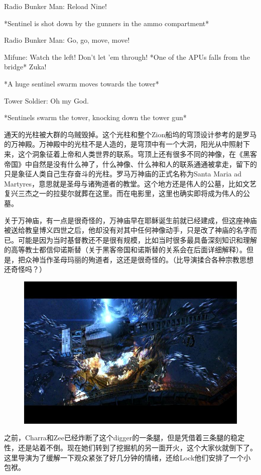 \documentclass[UTF8]{ctexart}
\newenvironment{myquote}{\color{green} \setlength{\leftskip}{6em} \setlength{\rightskip}{4em} \setlength{\parindent}{-2em}}{\par}
\begin{document}
\begin{myquote}
Radio Bunker Man: Reload Nine!

*Sentinel is shot down by the gunners in the ammo compartment*

Radio Bunker Man: Go, go, move, move!

Mifune: Watch the left! Don't let 'em through! *One of the APUs falls from the bridge* Zuka!

*A huge sentinel swarm moves towards the tower*

Tower Soldier: Oh my God.

*Sentinels swarm the tower, knocking down the tower gun*
\end{myquote}

通天的光柱被大群的乌贼毁掉。这个光柱和整个Zion船坞的穹顶设计参考的是罗马的万神殿。万神殿中的光柱不是人造的，是穹顶中有一个大洞，阳光从中照射下来，这个洞象征着上帝和人类世界的联系。穹顶上还有很多不同的神像，在《黑客帝国》中自然是没有什么神了，什么神像、什么神和人的联系通通被拿走，留下的只是象征人类自己生存奋斗的光柱。罗马万神庙的正式名称为Santa Maria ad Martyres，意思就是圣母与诸殉道者的教堂。这个地方还是伟人的公墓，比如文艺复兴三杰之一的拉斐尔就葬在这里。而在电影里，这里也确实即将成为伟人的公墓。

关于万神庙，有一点是很奇怪的，万神庙早在耶稣诞生前就已经建成，但这座神庙被送给教皇博义四世之后，他却没有对其中任何神像动手，只是改了神庙的名字而已。可能是因为当时基督教还不是很有规模，比如当时很多最具备深刻知识和理解的高等教士都信仰诺斯替（关于黑客帝国和诺斯替的关系会在后面详细解释）。但是，把众神当作圣母玛丽的殉道者，这还是很奇怪的。（比导演揉合各种宗教思想还奇怪吗？）

\begin{figure}[htb]
\centering
\includegraphics[width=0.5\linewidth]{fig/14a938db21aeea66d0164ed2.jpg}
\end{figure}

之前，Charra和Zee已经炸断了这个digger的一条腿，但是凭借着三条腿的稳定性，还是站着不倒。现在她们转到了挖掘机的另一面开火，这个大家伙就倒下了。这里导演为了缓解一下观众紧张了好几分钟的情绪，还给Lock他们安排了一个小包袱。
\end{document}
